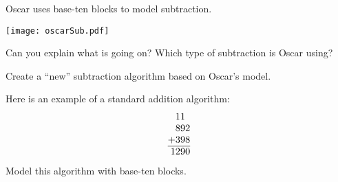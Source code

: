 \documentclass[nooutcomes]{ximera}
\begin{document}
\newpage
\begin{problem}
Oscar uses base-ten blocks to model subtraction.  
\begin{image}
\texttt{[image: oscarSub.pdf]}
\end{image}
Can you explain what is going on?  Which type of subtraction is Oscar using?  
\end{problem}

\begin{problem} Create a ``new'' subtraction algorithm based on Oscar's model.
\end{problem}

\newpage
\begin{problem}
Here is an example of a standard addition algorithm:
\[
\normalfont
\begin{tabular}{@{}r@{}}
11\phantom{0}\\
892\\
+398\\ \hline
1290
\end{tabular}
\]
Model this algorithm with base-ten blocks.
\end{problem}
\end{document}
